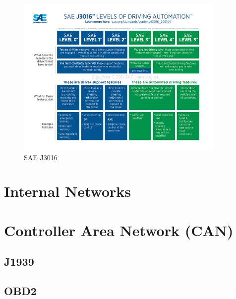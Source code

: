 \begin{figure}[h]
  \centering
  \includegraphics[width=0.9\textwidth]{images/sae-j3016-chart.png}
  \caption{SAE J3016}
  \label{fig:SAEJ3016}
\end{figure}

\section{Internal Networks}

\section{Controller Area Network (CAN)}

\subsection{J1939}

\subsection{OBD2}

